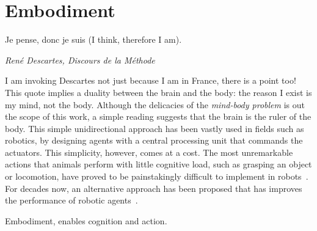 \section{Embodiment}
\label{ch:intro:Embodiment}
\epigraph{Je pense, donc je suis (I think, therefore I am).}
{\textit{ Ren\'{e} Descartes, Discours de la M\'{e}thode}}
\noindent
I am invoking Descartes not just because I am in France, there is a point too!
This quote implies a duality between the brain and the body: the reason I exist is my mind, not the body.
Although the delicacies of the \emph{mind-body problem} is out the scope of this work, a simple reading suggests that the brain is the ruler of the body.
This simple unidirectional approach has been vastly used in fields such as robotics, by designing agents with a central processing unit that commands the actuators.
This simplicity, however, comes at a cost.
The most unremarkable actions that animals perform with little cognitive load, such as grasping an object or locomotion, have proved to be painstakingly difficult to implement in robots~\cite{Pfeifer2006Book}.
For decades now, an alternative approach has been proposed that has improves the performance of robotic agents~\cite{Brooks1991AI}.
\par
Embodiment, enables cognition and action.



